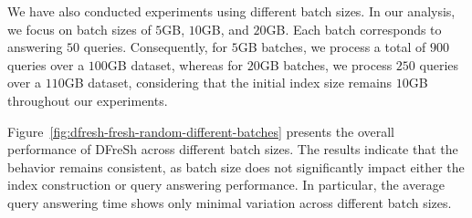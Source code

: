 We have also conducted experiments using different batch sizes. In our analysis,
we focus on batch sizes of $5$GB, $10$GB, and $20$GB. Each batch corresponds to
answering $50$ queries. Consequently, for $5$GB batches, we process a total of
$900$ queries over a $100$GB dataset, whereas for $20$GB batches, we process
$250$ queries over a $110$GB dataset, considering that the initial index size
remains $10$GB throughout our experiments.

Figure~\ref{fig:dfresh-fresh-random-different-batches} presents the overall
performance of DFreSh across different batch sizes. The results indicate that the
behavior remains consistent, as batch size does not significantly impact either the
index construction or query answering performance. In particular, the average query
answering time shows only minimal variation across different batch sizes.


